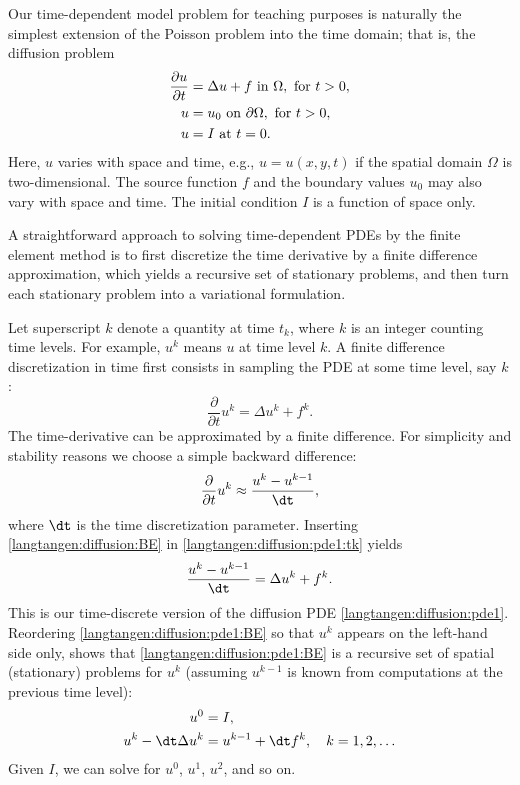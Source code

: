 Our time-dependent
model problem for teaching purposes is naturally the simplest
extension of the Poisson problem into the time domain; that is,
the diffusion problem
\begin{align}
\frac{\partial u}{\partial t} &= \Delta u + f \mbox{ in } \Omega, \hbox{ for } t>0,
\label{langtangen:diffusion:pde1}
\\
    u &= u_0 \mbox{ on } \partial \Omega,\hbox{ for } t>0,
\label{langtangen:diffusion:pde1:bc}
\\
    u &= I   \mbox{ at } t=0.
\label{langtangen:diffusion:pde1:ic}
\end{align}
Here, $u$ varies with space and time, e.g., $u=u(x,y,t)$ if the spatial
domain $\Omega$ is two-dimensional. The source function $f$ and the
boundary values $u_0$ may also vary with space and time.  The initial
condition $I$ is a function of space only.

A straightforward approach to solving time-dependent PDEs by the finite
element method is to first discretize the time derivative by a finite
difference approximation, which yields a recursive set of stationary
problems, and then turn each stationary problem into a variational
formulation.

Let superscript $k$ denote a quantity at time $t_k$, where $k$ is an
integer counting time levels. For example, $u^k$ means $u$ at time
level $k$.  A finite difference discretization in time first consists
in sampling the PDE at some time level, say $k$:
\begin{equation}
  \frac{\partial}{\partial t}u^k = \Delta u^k + f^k.
\label{langtangen:diffusion:pde1:tk}
\end{equation}
The time-derivative can be approximated by a finite difference.
For simplicity and stability reasons we choose a
simple backward difference:
\begin{equation}
  \frac{\partial}{\partial t} u^k\approx \frac{u^k - u^{k-1}}{\dt},
\label{langtangen:diffusion:BE}
\end{equation}
where ${\dt}$ is the time discretization parameter.
Inserting \eqref{langtangen:diffusion:BE} in \eqref{langtangen:diffusion:pde1:tk}
yields
\begin{equation}
  \frac{u^k - u^{k-1}}{\dt} = \Delta u^k + f^k.
\label{langtangen:diffusion:pde1:BE}
\end{equation}
This is our time-discrete version of the diffusion PDE \eqref{langtangen:diffusion:pde1}.
Reordering \eqref{langtangen:diffusion:pde1:BE} so that $u^k$ appears
on the left-hand side only, shows that \eqref{langtangen:diffusion:pde1:BE}
is a recursive set of
spatial (stationary) problems for $u^k$ (assuming $u^{k-1}$ is known from
computations at the previous time level):
\begin{align}
u^0 &= I,
\label{langtangen:diffusion:pde1:u0}
\\
u^k - {\dt}\Delta u^k &=  u^{k-1} + {\dt} f^k, \quad k=1,2,\ldots
\label{langtangen:diffusion:pde1:uk}
\end{align}
Given $I$, we can solve for $u^0$, $u^1$, $u^2$, and so on.

